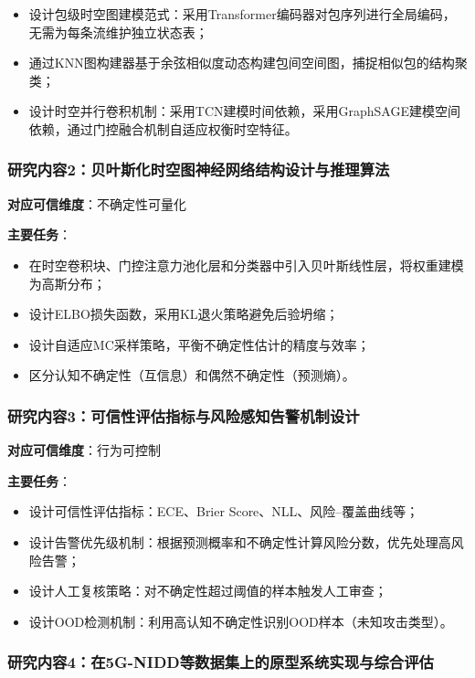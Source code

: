 \begin{itemize}
  \item 设计包级时空图建模范式：采用Transformer编码器对包序列进行全局编码，无需为每条流维护独立状态表；
  \item 通过KNN图构建器基于余弦相似度动态构建包间空间图，捕捉相似包的结构聚类；
  \item 设计时空并行卷积机制：采用TCN建模时间依赖，采用GraphSAGE建模空间依赖，通过门控融合机制自适应权衡时空特征。
\end{itemize}

\subsubsection{研究内容2：贝叶斯化时空图神经网络结构设计与推理算法}

\textbf{对应可信维度}：不确定性可量化

\textbf{主要任务}：

\begin{itemize}
  \item 在时空卷积块、门控注意力池化层和分类器中引入贝叶斯线性层，将权重建模为高斯分布；
  \item 设计ELBO损失函数，采用KL退火策略避免后验坍缩；
  \item 设计自适应MC采样策略，平衡不确定性估计的精度与效率；
  \item 区分认知不确定性（互信息）和偶然不确定性（预测熵）。
\end{itemize}

\subsubsection{研究内容3：可信性评估指标与风险感知告警机制设计}

\textbf{对应可信维度}：行为可控制

\textbf{主要任务}：

\begin{itemize}
  \item 设计可信性评估指标：ECE、Brier Score、NLL、风险–覆盖曲线等；
  \item 设计告警优先级机制：根据预测概率和不确定性计算风险分数，优先处理高风险告警；
  \item 设计人工复核策略：对不确定性超过阈值的样本触发人工审查；
  \item 设计OOD检测机制：利用高认知不确定性识别OOD样本（未知攻击类型）。
\end{itemize}

\subsubsection{研究内容4：在5G-NIDD等数据集上的原型系统实现与综合评估}

